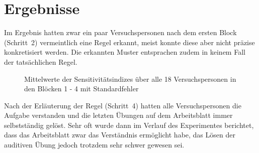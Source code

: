 \documentclass[doc,a4paper,12pt]{apa6}
\begin{document}
\section{Ergebnisse}

Im Ergebnis hatten zwar ein paar Versuchspersonen nach dem ersten Block (Schritt~2) vermeintlich eine Regel erkannt, meist konnte diese aber nicht präzise konkretisiert werden. Die erkannten Muster entsprachen zudem in keinem Fall der tatsächlichen Regel.

\begin{figure}[b]
  \centering
  \begin{minipage}{\textwidth}
    \vspace{10pt}
    \caption{Mittelwerte der Sensitivitätsindizes über alle 18 Versuchspersonen in den Blöcken 1 - 4 mit Standardfehler}
    \label{dprime}
  \end{minipage}
\end{figure}

Nach der Erläuterung der Regel (Schritt~4) hatten alle Versuchspersonen die Aufgabe verstanden und die letzten Übungen auf dem Arbeitsblatt immer selbstständig gelöst. Sehr oft wurde dann im Verlauf des Experimentes berichtet, dass das Arbeitsblatt zwar das Verständnis ermöglicht habe, das Lösen der auditiven Übung jedoch trotzdem sehr schwer gewesen sei.

\end{document}
